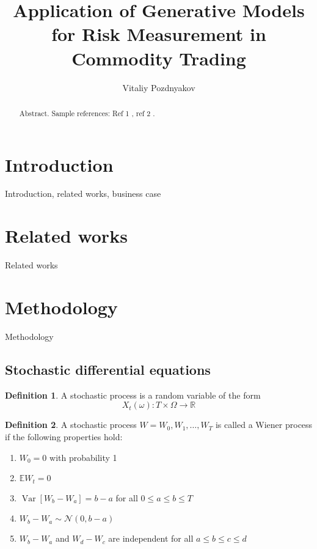 \documentclass{article}
\title{Application of Generative Models for Risk Measurement in Commodity Trading}
\author{Vitaliy Pozdnyakov}
\date{}
\theoremstyle{definition}
\newtheorem{definition}{Definition}[section]
\DeclareMathOperator{\Var}{Var}
\begin{document}
\maketitle

\begin{abstract}
    Abstract. Sample references: Ref 1 \cite{renscen}, ref 2 \citet{jebara}.
\end{abstract}

\section{Introduction}
Introduction, related works, business case

\section{Related works}
Related works

\section{Methodology}
Methodology

\subsection{Stochastic differential equations}

\theoremstyle{definition}
\begin{definition}
    A stochastic process is a random variable of the form
    $$X_t(\omega): T \times \Omega \to \mathbb R$$
\end{definition}

\begin{definition}
    A stochastic process $W = W_0, W_1, \dots, W_T$ is called a Wiener process if the following properties hold:
    \begin{enumerate}
        \item $W_0 = 0$ with probability 1
        \item $\mathbb E W_t = 0$
        \item $\Var[W_b - W_a] = b - a$ for all $0\leq a \leq b \leq T$
        \item $W_b - W_a \sim \mathcal N (0, b-a)$
        \item $W_b - W_a$ and $W_d - W_c$ are independent for all $a \leq b \leq c \leq d$
    \end{enumerate}
\end{definition}
\end{document}
